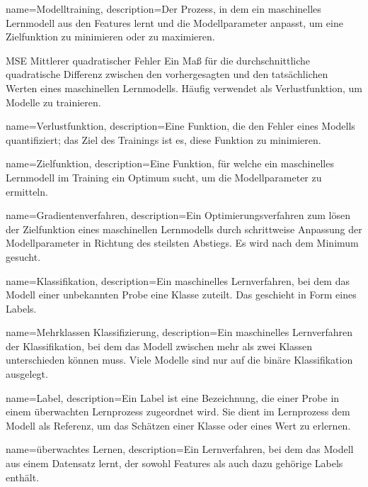 {
        name=Modelltraining,
        description={Der Prozess, in dem ein maschinelles Lernmodell aus den Features lernt und die Modellparameter anpasst, um eine Zielfunktion zu minimieren oder zu maximieren.}
}

\newglossaryentrywithacronym
{MSE}
{Mittlerer quadratischer Fehler}
{Ein Maß für die durchschnittliche quadratische Differenz zwischen den vorhergesagten und den tatsächlichen Werten eines maschinellen Lernmodells. Häufig verwendet als Verlustfunktion, um Modelle zu trainieren.}

{
        name=Verlustfunktion,
        description={Eine Funktion, die den Fehler eines Modells quantifiziert; das Ziel des Trainings ist es, diese Funktion zu minimieren.}
}

{
        name=Zielfunktion,
        description={Eine Funktion, für welche ein maschinelles Lernmodell im Training ein Optimum sucht, um die Modellparameter zu ermitteln.}
}

{
        name=Gradientenverfahren,
        description={Ein Optimierungsverfahren zum lösen der Zielfunktion eines maschinellen Lernmodells durch schrittweise Anpassung der Modellparameter in Richtung des steilsten Abstiegs. Es wird nach dem Minimum gesucht.}
}

{
        name=Klassifikation,
        description={Ein maschinelles Lernverfahren, bei dem das Modell einer unbekannten Probe eine Klasse zuteilt. Das geschieht in Form eines Labels.}
}


{
        name=Mehrklassen Klassifizierung,
        description={Ein maschinelles Lernverfahren der Klassifikation, bei dem das Modell zwischen mehr als zwei Klassen unterschieden können muss. Viele Modelle sind nur auf die binäre Klassifikation ausgelegt.}
}

{
        name=Label,
        description={Ein Label ist eine Bezeichnung, die einer Probe in einem überwachten Lernprozess zugeordnet wird. Sie dient im Lernprozess dem Modell als Referenz, um das Schätzen einer Klasse oder eines Wert zu erlernen.}
}

{
        name=überwachtes Lernen,
        description={Ein Lernverfahren, bei dem das Modell aus einem Datensatz lernt, der sowohl Features als auch dazu gehörige Labels enthält.}
}


